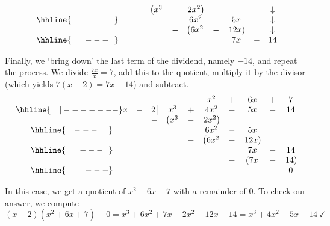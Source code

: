 \begin{exampleSol}
\begin{enumerate}
\[\begin{array}{cccccccccc}
 &  &  -& \left(x^3 \right. & - & \left.  2x^2\right) &  & &  & \downarrow  \\ \hhline{~~~---~~~~} 
 &  &  &   &  & 6 x^2 & - & 5x &  &  \downarrow \\ 
 &  &  &   & - & \left(6 x^2 \right. & - & \left. 12x \right) &  & \downarrow \\ \hhline{~~~~~---~~} 
 &  &  &   &   &  & & 7x  & - & 14 \\
 
\end{array}\]

\setlength\arraycolsep{5pt}
\setlength\extrarowheight{0pt}

Finally, we `bring down' the last term of the dividend, namely $-14$, and repeat the process.  We divide $\frac{7x}{x} = 7$, add this to the quotient, multiply it by the divisor (which yields $7(x - 2) = 7x - 14$) and subtract.\setlength\arraycolsep{0.1pt}\setlength\extrarowheight{2pt}\[ \begin{array}{cccccccccc}
& & & & & x^2 & + & 6x & + & 7 \\ \hhline{~~~|-------}
x & - & 2 \, \vline& x^3 & + & 4x^2 & - & 5x & - & 14 \\
 &  &  -& \left(x^3 \right. & - & \left.  2x^2\right) &  &  &  &  \\ \hhline{~~~---~~~~} 
 &  &  &   &  & 6 x^2 & - & 5x &  &  \\ 
 &  &  &   & - & \left(6 x^2 \right. & - & \left. 12x \right) &  &  \\ \hhline{~~~~~---~~} 
 &  &  &   &   &  & & 7x  & - & 14 \\
 &  &  &   &   &  & - & \left( 7x \right. & - & \left. 14 \right) \\ \hhline{~~~~~~~---} 
 &   &  &  &  &  &  &  &  & 0
\end{array}\]
\setlength\arraycolsep{5pt}
\setlength\extrarowheight{0pt}

In this case, we get a quotient of $x^2 + 6x + 7$ with a remainder of $0$.  To check our answer, we compute  \[(x-2)\left(x^2 + 6x + 7\right) + 0 = x^3 + 6x^2 + 7x - 2x^2 - 12x -14 =  x^3 + 4x^2 - 5x - 14 \, \checkmark \]



\end{enumerate}
\end{exampleSol}
